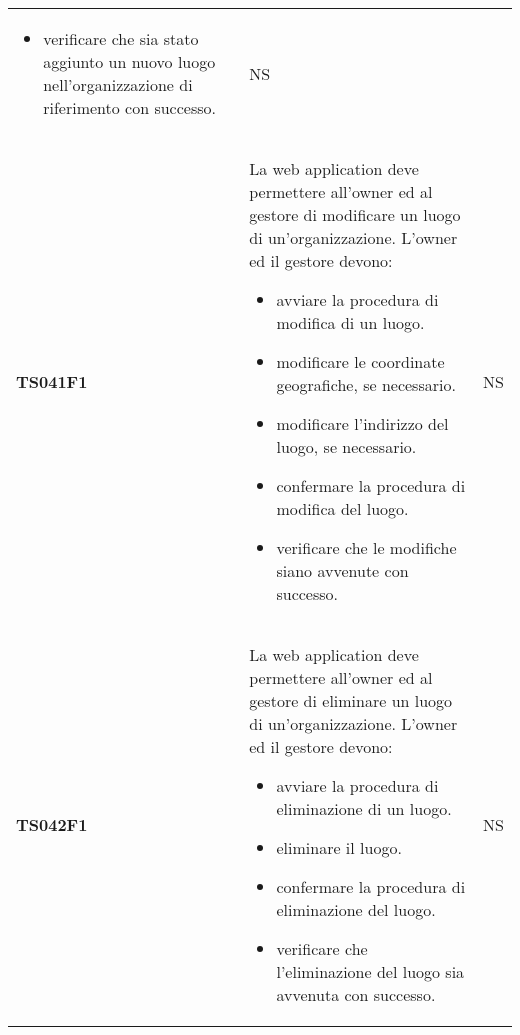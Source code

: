 \documentclass[../piano-di-qualifica.tex]{subfiles}
\begin{document}
\begin{longtable}[H]{>{\centering\bfseries}m{3cm} >{}m{10cm} >{\centering\arraybackslash}m{3cm}}
\begin{itemize}
    \item verificare che sia stato aggiunto un nuovo luogo nell'organizzazione di riferimento con successo.
  \end{itemize}
                     & NS                                                                                                                                                                                                                                                               \\
  TS041F1            & La web application deve permettere all'owner ed al gestore di modificare un luogo di un'organizzazione. \newline
  L'owner ed il gestore devono:
  \begin{itemize}
    \item avviare la procedura di modifica di un luogo.
    \item modificare le coordinate geografiche, se necessario.
    \item modificare l'indirizzo del luogo, se necessario.
    \item confermare la procedura di modifica del luogo.
    \item verificare che le modifiche siano avvenute con successo.
  \end{itemize}
                     & NS                                                                                                                                                                                                                                                               \\
  TS042F1            & La web application deve permettere all'owner ed al gestore di eliminare un luogo di un'organizzazione. \newline
  L'owner ed il gestore devono:
  \begin{itemize}
    \item avviare la procedura di eliminazione di un luogo.
    \item eliminare il luogo.
    \item confermare la procedura di eliminazione del luogo.
    \item verificare che l'eliminazione del luogo sia avvenuta con successo.
  \end{itemize}
                     & NS                                                                                                                                                                                                                                                               \\

\end{longtable}
\end{document}
